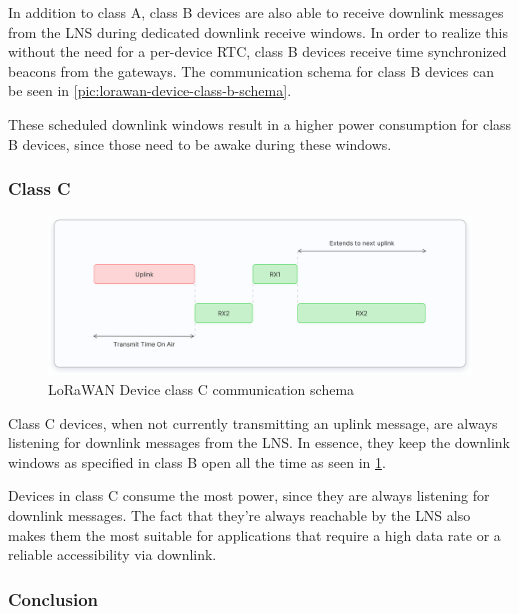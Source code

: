 In addition to class A, class B devices are also able to receive downlink messages from the \ac{LNS} during dedicated downlink receive windows.
In order to realize this without the need for a per-device \ac{RTC}, class B devices receive time synchronized beacons from the gateways.
The communication schema for class B devices can be seen in \cref{pic:lorawan-device-class-b-schema}.

These scheduled downlink windows result in a higher power consumption for class B devices, since those need to be awake during these windows.

\subsubsection{Class C}

\begin{figure}[h]
    \centering
    \includegraphics[width=1\textwidth]{pictures/device-classes/class-c.png}
    \caption{\ac{LoRaWAN} Device class C communication schema~\protect\cite{the_things_industries_bv_device_nodate}}\label{pic:lorawan-device-class-c-schema}
\end{figure}

Class C devices, when not currently transmitting an uplink message, are always listening for downlink messages from the \ac{LNS}.
In essence, they keep the downlink windows as specified in class B open all the time as seen in \cref{pic:lorawan-device-class-c-schema}.

Devices in class C consume the most power, since they are always listening for downlink messages.
The fact that they're always reachable by the \ac{LNS} also makes them the most suitable for applications that require a high data rate or a reliable accessibility via downlink.

\subsubsection{Conclusion}


